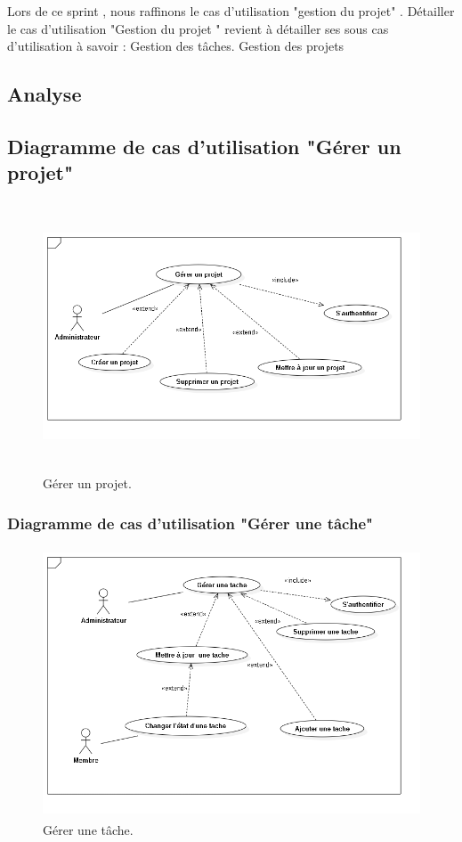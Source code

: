 Lors de ce sprint , nous  raffinons le cas d’utilisation "gestion du projet" .
D\'{e}tailler le cas d'utilisation "Gestion du projet " revient \`{a} d\'{e}tailler
ses sous cas d'utilisation \`{a} savoir : \newline
\textbullet{} Gestion des t\^{a}ches. \newline
\textbullet{} Gestion des projets \newline
\subsection{Analyse}

\subsection{ Diagramme de cas d'utilisation "G\'{e}rer un projet"}

\begin{figure}[H]
\center
\includegraphics[width=13cm,height=8cm]{./figures/ucP.png}
\caption{G\'{e}rer un projet.}

\end{figure}

\subsubsection{ Diagramme de cas d'utilisation "G\'{e}rer une t\^{a}che"}
\begin{figure}[H]
\center
\includegraphics[width=13cm,height=8cm]{./figures/ucT.png}
\caption{G\'{e}rer une t\^{a}che.}

\end{figure}



